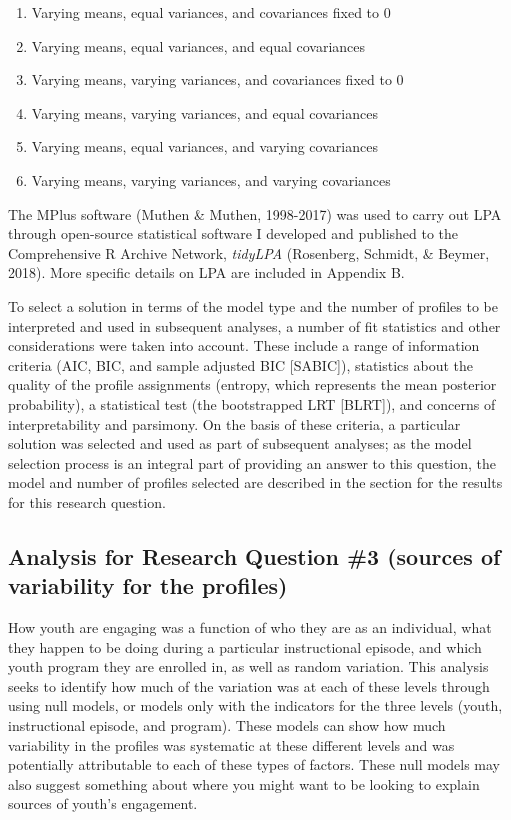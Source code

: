 \documentclass[]{msu-thesis}
\providecommand{\tightlist}{%
  \setlength{\itemsep}{0pt}\setlength{\parskip}{0pt}}
\theoremstyle{definition}
\theoremstyle{definition}
\theoremstyle{definition}
\theoremstyle{remark}
\begin{document}
\begin{enumerate}
\def\labelenumi{\arabic{enumi}.}
\tightlist
\item
  Varying means, equal variances, and covariances fixed to 0
\item
  Varying means, equal variances, and equal covariances
\item
  Varying means, varying variances, and covariances fixed to 0
\item
  Varying means, varying variances, and equal covariances
\item
  Varying means, equal variances, and varying covariances
\item
  Varying means, varying variances, and varying covariances
\end{enumerate}

The MPlus software (Muthen \& Muthen, 1998-2017) was used to carry out
LPA through open-source statistical software I developed and published
to the Comprehensive R Archive Network, \emph{tidyLPA} (Rosenberg,
Schmidt, \& Beymer, 2018). More specific details on LPA are included in
Appendix B.

To select a solution in terms of the model type and the number of
profiles to be interpreted and used in subsequent analyses, a number of
fit statistics and other considerations were taken into account. These
include a range of information criteria (AIC, BIC, and sample adjusted
BIC {[}SABIC{]}), statistics about the quality of the profile
assignments (entropy, which represents the mean posterior probability),
a statistical test (the bootstrapped LRT {[}BLRT{]}), and concerns of
interpretability and parsimony. On the basis of these criteria, a
particular solution was selected and used as part of subsequent
analyses; as the model selection process is an integral part of
providing an answer to this question, the model and number of profiles
selected are described in the section for the results for this research
question.

\subsection{Analysis for Research Question \#3 (sources of variability
for the
profiles)}\label{analysis-for-research-question-3-sources-of-variability-for-the-profiles}

How youth are engaging was a function of who they are as an individual,
what they happen to be doing during a particular instructional episode,
and which youth program they are enrolled in, as well as random
variation. This analysis seeks to identify how much of the variation was
at each of these levels through using null models, or models only with
the indicators for the three levels (youth, instructional episode, and
program). These models can show how much variability in the profiles was
systematic at these different levels and was potentially attributable to
each of these types of factors. These null models may also suggest
something about where you might want to be looking to explain sources of
youth's engagement.
\end{document}
